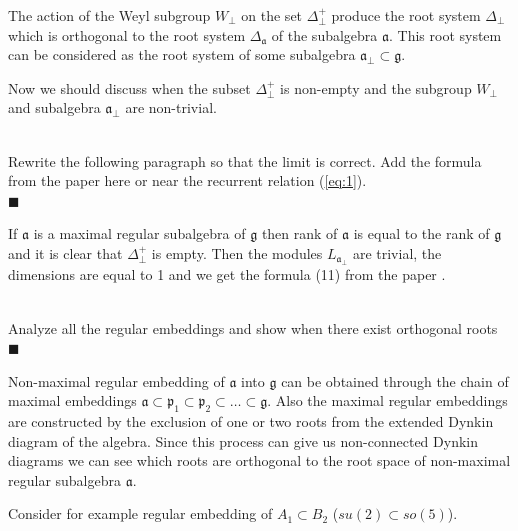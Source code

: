 \documentclass[a4paper,12pt]{article}
\theoremstyle{definition} \newtheorem{Def}{Definition}
\newenvironment{comment}
{\par\noindent{\bf TODO}\\}
{\\\hfill$\scriptstyle\blacksquare$\par}
\begin{document}
The action of the Weyl subgroup $W_{\bot}$ on the set $\Delta^{+}_{\bot}$ produce the root system $\Delta_{\bot}$ which is orthogonal to the root system $\Delta_{\mathfrak{a}}$ of the subalgebra $\mathfrak{a}$. This root system can be considered as the root system of some subalgebra $\mathfrak{a}_{\bot}\subset \mathfrak{g}$.

Now we should discuss when the subset $\Delta^{+}_{\bot}$ is non-empty and the subgroup $W_{\bot}$ and subalgebra $\mathfrak{a}_{\bot}$ are non-trivial.
\begin{comment}
  Rewrite the following paragraph so that the limit is correct. Add the formula from the paper \cite{ilyin812pbc} here or near the recurrent relation (\ref{eq:1}).
\end{comment}
If $\mathfrak{a}$ is a maximal regular subalgebra of $\mathfrak{g}$ then rank of $\mathfrak{a}$ is equal to the rank of $\mathfrak{g}$ and it is clear that $\Delta^{+}_{\bot}$ is empty.
Then the modules $L_{\mathfrak{a}_{\bot}}$ are trivial, the dimensions are equal to 1 and we get the formula (11) from the paper \cite{ilyin812pbc}.
\begin{comment}
  Analyze all the regular embeddings and show when there exist orthogonal roots 
\end{comment}
Non-maximal regular embedding of $\mathfrak{a}$ into $\mathfrak{g}$ can be obtained through the chain of maximal embeddings $\mathfrak{a}\subset \mathfrak{p}_1\subset \mathfrak{p}_2\subset\dots \subset \mathfrak{g}$. Also the maximal regular embeddings are constructed by the exclusion of one or two roots from the extended Dynkin diagram of the algebra. Since this process can give us non-connected Dynkin diagrams we can see which roots are orthogonal to the root space of non-maximal regular subalgebra $\mathfrak{a}$. 

Consider for example regular embedding of $A_1\subset B_2$ ($su(2)\subset so(5)$). 
\end{document}
